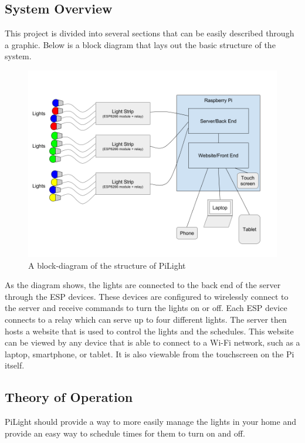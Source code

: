 \subsection{System Overview}
This project is divided into several sections that can be easily described through a graphic. Below is a block diagram that lays out the basic structure of the system.\\
\begin{figure}[h!]
   \includegraphics[width=1.0\textwidth]{block-diagram.png}
   \caption{A block-diagram of the structure of PiLight}
\end{figure}
As the diagram shows, the lights are connected to the back end of the server through the ESP devices. These devices are configured to wirelessly connect to the server and receive commands to turn the lights on or off. Each ESP device connects to a relay which can serve up to four different lights. The server then hosts a website that is used to control the lights and the schedules. This website can be viewed by any device that is able to connect to a Wi-Fi network, such as a laptop, smartphone, or tablet. It is also viewable from the touchscreen on the Pi itself.
\subsection{Theory of Operation}
PiLight should provide a way to more easily manage the lights in your home and provide an easy way to schedule times for them to turn on and off. 
